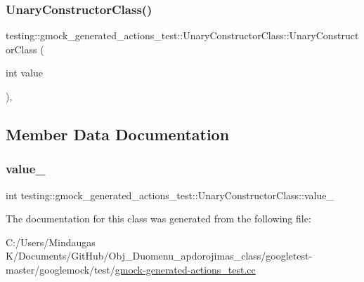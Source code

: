 \subsubsection{\texorpdfstring{UnaryConstructorClass()}{UnaryConstructorClass()}\hspace{0.1cm}{\footnotesize\ttfamily [3/3]}}
{\footnotesize\ttfamily testing\+::gmock\+\_\+generated\+\_\+actions\+\_\+test\+::\+Unary\+Constructor\+Class\+::\+Unary\+Constructor\+Class (\begin{DoxyParamCaption}\item[{int}]{value }\end{DoxyParamCaption})\hspace{0.3cm}{\ttfamily [inline]}, {\ttfamily [explicit]}}



\subsection{Member Data Documentation}
\mbox{\label{classtesting_1_1gmock__generated__actions__test_1_1_unary_constructor_class_a5e96ce337c5eb7016eba2ea66ae46851}} 
\subsubsection{\texorpdfstring{value\_}{value\_}}
{\footnotesize\ttfamily int testing\+::gmock\+\_\+generated\+\_\+actions\+\_\+test\+::\+Unary\+Constructor\+Class\+::value\+\_\+}



The documentation for this class was generated from the following file\+:\begin{DoxyCompactItemize}
\item 
C\+:/\+Users/\+Mindaugas K/\+Documents/\+Git\+Hub/\+Obj\+\_\+\+Duomenu\+\_\+apdorojimas\+\_\+class/googletest-\/master/googlemock/test/\mbox{\hyperlink{googletest-master_2googlemock_2test_2gmock-generated-actions__test_8cc}{gmock-\/generated-\/actions\+\_\+test.\+cc}}\end{DoxyCompactItemize}
